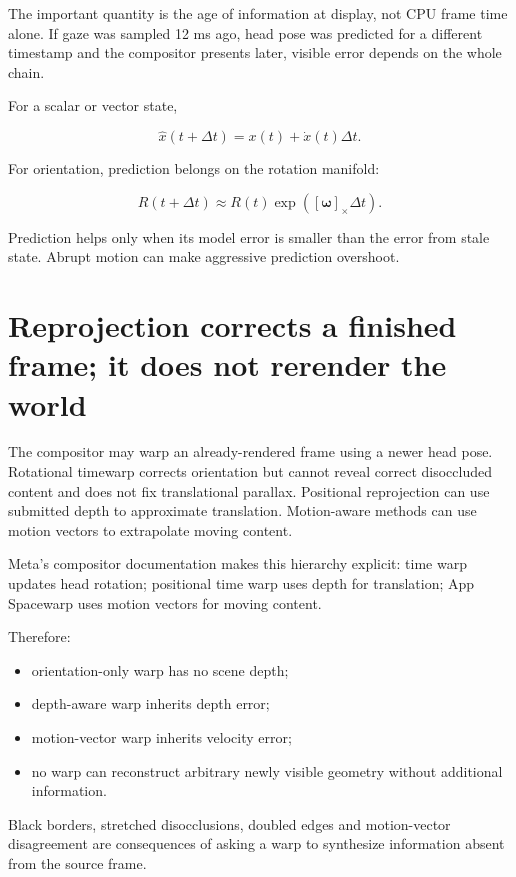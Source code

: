 The important quantity is the age of information at display, not CPU frame time alone. If gaze was sampled 12 ms ago, head pose was predicted for a different timestamp and the compositor presents later, visible error depends on the whole chain.

For a scalar or vector state,

\[
\hat{x}(t+\Delta t)=x(t)+\dot{x}(t)\Delta t.
\]

For orientation, prediction belongs on the rotation manifold:

\[
R(t+\Delta t)\approx R(t)\exp([\boldsymbol\omega]_\times\Delta t).
\]

Prediction helps only when its model error is smaller than the error from stale state. Abrupt motion can make aggressive prediction overshoot.

\section{Reprojection corrects a finished frame; it does not rerender the world}\label{04-visual-computing-ii-ch035-reprojection-corrects-a-finished-frame-it-does-not-rerender-the-world}

The compositor may warp an already-rendered frame using a newer head pose. Rotational timewarp corrects orientation but cannot reveal correct disoccluded content and does not fix translational parallax. Positional reprojection can use submitted depth to approximate translation. Motion-aware methods can use motion vectors to extrapolate moving content.

Meta's compositor documentation makes this hierarchy explicit: time warp updates head rotation; positional time warp uses depth for translation; App Spacewarp uses motion vectors for moving content.

Therefore:

\begin{itemize}
\tightlist
\item
  orientation-only warp has no scene depth;
\item
  depth-aware warp inherits depth error;
\item
  motion-vector warp inherits velocity error;
\item
  no warp can reconstruct arbitrary newly visible geometry without additional information.
\end{itemize}

Black borders, stretched disocclusions, doubled edges and motion-vector disagreement are consequences of asking a warp to synthesize information absent from the source frame.

